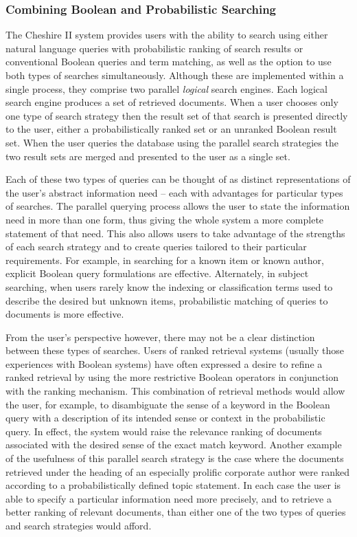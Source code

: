 \subsubsection{Combining Boolean and Probabilistic Searching}

The Cheshire II system provides users with the ability to search using
either natural language queries with probabilistic ranking of search
results or conventional Boolean queries and term matching, as well as
the option to use both types of searches simultaneously.  Although
these are implemented within a single process, they comprise two
parallel {\em logical} search engines.  Each logical search engine
produces a set of retrieved documents.  When a user chooses only one
type of search strategy then the result set of that search is
presented directly to the user, either a probabilistically ranked set
or an unranked Boolean result set. When the user queries the database
using the parallel search strategies the two result sets are merged
and presented to the user as a single set.

Each of these two types of queries can be thought of as distinct
representations of the user's abstract information need -- each with 
advantages for particular types of searches. The parallel querying process
allows the user to state the information need in more than one form, thus
giving the whole system a more complete statement of that need.
This also allows users to take advantage of the strengths of each
search strategy and to create queries tailored to their particular
requirements. For example, in searching for a known item or known author,
explicit Boolean query formulations are effective.
Alternately, in subject searching, when users rarely know the indexing
or classification terms used to describe the desired but unknown items,
probabilistic matching of queries to documents is more effective. 

From the user's perspective however, there may not be a clear
distinction between these types of searches.  Users of ranked
retrieval systems (usually those experiences with Boolean systems)
have often expressed a desire to refine a ranked retrieval by using
the more restrictive Boolean operators in conjunction with the ranking
mechanism.  This combination of retrieval methods would allow the
user, for example, to disambiguate the sense of a keyword in the
Boolean query with a description of its intended sense or context in
the probabilistic query. In effect, the system would raise the
relevance ranking of documents associated with the desired sense of
the exact match keyword.  Another example of the usefulness of this
parallel search strategy is the case where the documents retrieved
under the heading of an especially prolific corporate author were
ranked according to a probabilistically defined topic statement. In
each case the user is able to specify a particular information need
more precisely, and to retrieve a better ranking of relevant
documents, than either one of the two types of queries and search
strategies would afford.


